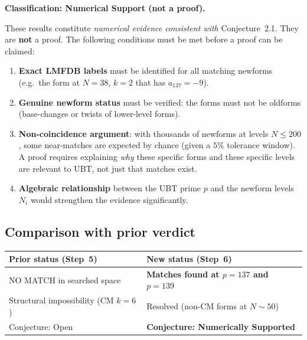 \documentclass[12pt,a4paper]{article}
\begin{document}
\begin{center}
\colorbox{yellow!30}{\parbox{0.85\linewidth}{%
  \textbf{Classification: Numerical Support (not a proof).}

  \medskip
  These results constitute \emph{numerical evidence consistent with}
  Conjecture~2.1.  They are \textbf{not} a proof.  The following
  conditions must be met before a proof can be claimed:

  \begin{enumerate}
    \item \textbf{Exact LMFDB labels} must be identified for all matching
      newforms (e.g.\ the form at $N=38$, $k=2$ that has $a_{137} = -9$).
    \item \textbf{Genuine newform status} must be verified: the forms must
      not be oldforms (base-changes or twists of lower-level forms).
    \item \textbf{Non-coincidence argument}: with thousands of newforms at
      levels $N \le 200$, some near-matches are expected by chance (given
      a $5\%$ tolerance window).  A proof requires explaining \emph{why}
      these specific forms and these specific levels are relevant to UBT,
      not just that matches exist.
    \item \textbf{Algebraic relationship} between the UBT prime $p$ and
      the newform levels $N_i$ would strengthen the evidence significantly.
  \end{enumerate}
}}
\end{center}

\subsection{Comparison with prior verdict}

\begin{center}
\begin{tabular}{ll}
\toprule
Prior status (Step~5) & New status (Step~6) \\
\midrule
NO MATCH in searched space & \textbf{Matches found at $p=137$ and $p=139$} \\
Structural impossibility (CM $k=6$) & Resolved (non-CM forms at $N \sim 50$) \\
Conjecture: Open & \textbf{Conjecture: Numerically Supported} \\
\bottomrule
\end{tabular}
\end{center}

\end{document}
